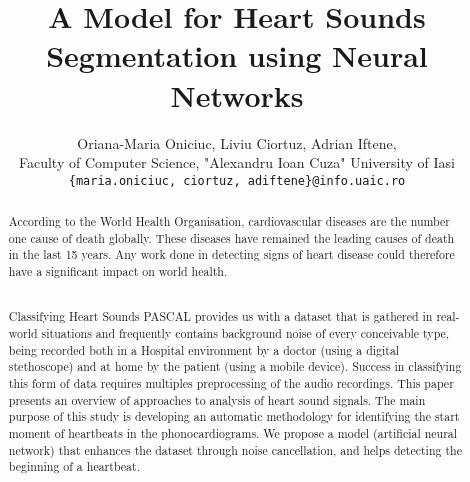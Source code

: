 \documentclass{article}
\title{A Model for Heart Sounds Segmentation using Neural Networks}
\author{Oriana-Maria Oniciuc, Liviu Ciortuz, Adrian Iftene, \\
Faculty of Computer Science, "Alexandru Ioan Cuza" University of Iasi\\
  \texttt{\{maria.oniciuc, ciortuz, adiftene\}@info.uaic.ro}}
\date{}
\begin{document}
\maketitle

\begin{abstract}
According to the World Health Organisation, cardiovascular diseases are the number one cause of death globally. These diseases have remained the leading causes of death in the last 15 years. Any work done in detecting signs of heart disease could therefore have a significant impact on world health. 
\\
\

Classifying Heart Sounds PASCAL provides us with a dataset that is gathered in real-world situations and frequently contains background noise of every conceivable type, being recorded both in a Hospital environment by a doctor (using a digital stethoscope) and at home by the patient (using a mobile device). Success in classifying this form of data requires multiples preprocessing of the audio recordings. This paper presents an overview of approaches to analysis of heart sound signals. The main purpose of this study is developing an automatic methodology for identifying the start moment of heartbeats in the phonocardiograms. We propose a model (artificial neural network) that enhances the dataset through noise cancellation, and helps detecting the beginning of a heartbeat.

\end{abstract}
\end{document}
